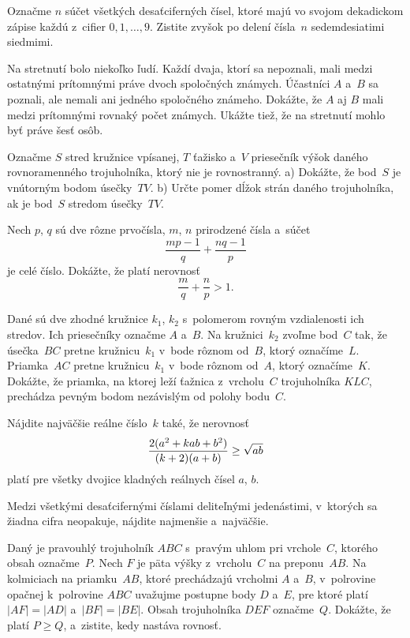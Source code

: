 ﻿{%
Označme $n$ súčet všetkých desaťciferných čísel, ktoré majú vo svojom
dekadickom zápise
každú z~cifier $0,1,\dots,9$. Zistite zvyšok po delení čísla~$n$
sedemdesiatimi siedmimi.}

{%
Na stretnutí bolo niekoľko ľudí. Každí dvaja, ktorí sa nepoznali, mali medzi
ostatnými prítomnými práve dvoch spoločných známych. Účastníci $A$ a~$B$ sa
poznali, ale nemali ani jedného spoločného známeho. Dokážte, že $A$ aj $B$
mali medzi prítomnými rovnaký počet známych.
Ukážte tiež, že na stretnutí mohlo byť práve šesť osôb.}

{%
Označme $S$ stred kružnice vpísanej, $T$ ťažisko a~$V$ priesečník výšok
daného rovnoramenného trojuholníka, ktorý nie je rovnostranný.
\ite a) Dokážte, že bod~$S$ je vnútorným bodom úsečky~$TV$.
\ite b) Určte pomer dĺžok strán daného trojuholníka, ak je bod~$S$
stredom úsečky~$TV$.\endgraf}

{%
Nech $p$, $q$ sú dve rôzne prvočísla, $m$, $n$ prirodzené čísla a~súčet
$$
\frac{mp-1}{q}+\frac{nq-1}{p}
$$
je celé číslo. Dokážte, že platí nerovnosť
$$
\frac{m}{q}+\frac{n}{p}>1.
$$}

{%
Dané sú dve zhodné kružnice $k_1$, $k_2$ s~polomerom rovným vzdialenosti ich stredov.
Ich priesečníky označme $A$ a~$B$.
Na kružnici~$k_2$ zvoľme bod~$C$ tak, že úsečka~$BC$ pretne kružnicu~$k_1$
v~bode rôznom od~$B$, ktorý označíme~$L$. Priamka~$AC$ pretne kružnicu~$k_1$
v~bode rôznom od~$A$, ktorý označíme~$K$. Dokážte, že priamka, na ktorej leží
ťažnica z~vrcholu~$C$ trojuholníka $KLC$, prechádza pevným bodom nezávislým od
polohy bodu~$C$.}

{%
Nájdite najväčšie reálne číslo~$k$ také, že nerovnosť
$$
{2(a^2+kab+b^2)\over (k+2)(a+b)}\ge \sqrt{ab}
$$
platí pre všetky dvojice kladných reálnych čísel $a$, $b$.}

{%
Medzi všetkými desaťcifernými číslami deliteľnými jedenástimi, v~ktorých sa
žiadna cifra neopakuje, nájdite najmenšie a~najväčšie.}

{%
Daný je pravouhlý trojuholník $ABC$ s~pravým uhlom pri
vrchole~$C$, ktorého obsah označme~$P$. Nech $F$ je päta výšky z~vrcholu~$C$
na preponu~$AB$. Na kolmiciach na priamku~$AB$, ktoré prechádzajú vrcholmi $A$ a~$B$,
v~polrovine opačnej k~polrovine $ABC$ uvažujme postupne
body $D$ a~$E$, pre ktoré platí $|AF|=|AD|$ a~$|BF|=|BE|$. Obsah
trojuholníka $DEF$ označme~$Q$. Dokážte, že platí $P\ge Q$, a~zistite, kedy
nastáva rovnosť.}

